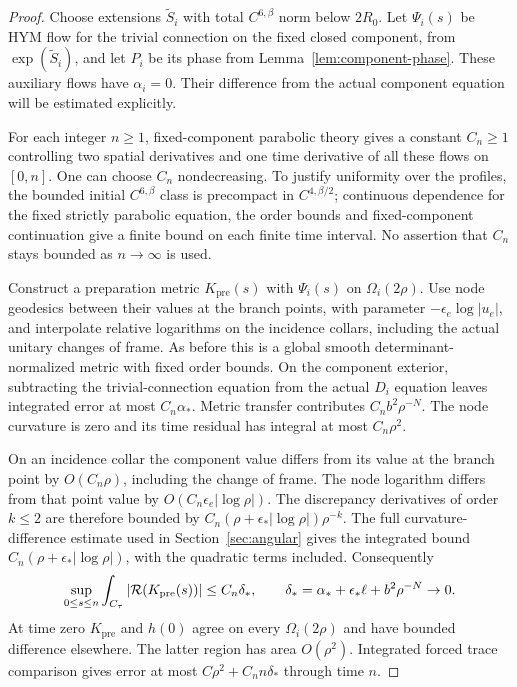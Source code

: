 \begin{proof}
Choose extensions $\widetilde S_i$ with total $C^{6,\beta}$
norm below $2R_0$. Let $\Psi_i(s)$ be HYM flow for the trivial
connection on the fixed closed component, from
$\exp(\widetilde S_i)$, and let $P_i$ be its phase from
Lemma~\ref{lem:component-phase}. These auxiliary flows have
$\alpha_i=0$. Their difference from the actual component
equation will be estimated explicitly.

For each integer $n\ge1$, fixed-component parabolic theory
gives a constant $C_n\ge1$ controlling two spatial derivatives
and one time derivative of all these flows on $[0,n]$.
One can choose $C_n$ nondecreasing. To justify uniformity over
the profiles, the bounded initial $C^{6,\beta}$ class is
precompact in $C^{4,\beta/2}$; continuous dependence for the
fixed strictly parabolic equation, the order bounds and
fixed-component continuation give a finite bound on each
finite time interval. No assertion that $C_n$ stays bounded
as $n\to\infty$ is used.

Construct a preparation metric $K_{\mathrm{pre}}(s)$ with
$\Psi_i(s)$ on $\Omega_i(2\rho)$. Use node geodesics between
their values at the branch points, with parameter
$-\epsilon_e\log|u_e|$, and interpolate relative logarithms
on the incidence collars, including the actual unitary
changes of frame. As before this is a global smooth
determinant-normalized metric with fixed order bounds.
On the component exterior, subtracting the trivial-connection
equation from the actual $D_i$ equation leaves integrated
error at most $C_n\alpha_*$. Metric transfer contributes
$C_n b^2\rho^{-N}$. The node curvature is zero and its time
residual has integral at most $C_n\rho^2$.

On an incidence collar the component value differs from its
value at the branch point by $O(C_n\rho)$, including the
change of frame. The node logarithm differs from that point
value by $O(C_n\epsilon_e|\log\rho|)$. The discrepancy
derivatives of order $k\le2$ are therefore bounded by
$C_n(\rho+\epsilon_*|\log\rho|)\rho^{-k}$. The full
curvature-difference estimate used in Section~\ref{sec:angular}
gives the integrated bound
$C_n(\rho+\epsilon_*|\log\rho|)$, with the quadratic terms
included. Consequently
\begin{equation}\label{eq:preparation-residual}
 \sup_{0\le s\le n}\int_{C_\tau}|\mathcal R(K_{\mathrm{pre}}(s))|
       \le C_n\delta_*,
 \qquad
 \delta_*=\alpha_*+\epsilon_*\ell+b^2\rho^{-N}\to0.
\end{equation}
At time zero $K_{\mathrm{pre}}$ and $h(0)$ agree on every
$\Omega_i(2\rho)$ and have bounded difference elsewhere.
The latter region has area $O(\rho^2)$. Integrated forced
trace comparison gives error at most
$C\rho^2+C_nn\delta_*$ through time $n$.


\end{proof}
